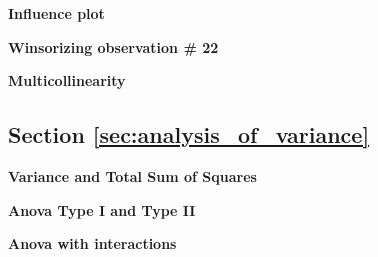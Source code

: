 \begin{exercise}
\label{ex:influence_plot}

\textbf{Influence plot}



\end{exercise}

\begin{exercise}
\label{ex:leave_out_observation}

\textbf{Winsorizing observation \# 22}




\end{exercise}

\begin{exercise}
\label{ex:vif}

\textbf{Multicollinearity}




\end{exercise}

\subsection{Section \ref{sec:analysis_of_variance}}

\begin{exercise}
\label{ex:anova}

\textbf{Variance and Total Sum of Squares}







\end{exercise}

\begin{exercise}
\label{ex:anova.mod.1}

\textbf{Anova Type I and Type II}





\end{exercise}

\begin{exercise}
\label{ex:anova.mod.3}

\textbf{Anova with interactions}



\end{exercise}

